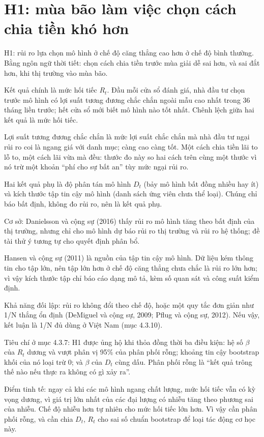 \section{H1: mùa bão làm việc chọn cách chia tiền khó hơn}

H1: rủi ro lựa chọn mô hình ở chế độ căng thẳng cao hơn ở chế độ bình thường. Bằng ngôn ngữ thời tiết: chọn cách chia tiền trước mùa giải dễ sai hơn, và sai đắt hơn, khi thị trường vào mùa bão.

Kết quả chính là mức hối tiếc \(R_{t}\). Đầu mỗi cửa sổ đánh giá, nhà đầu tư chọn trước mô hình có lợi suất tương đương chắc chắn ngoài mẫu cao nhất trong 36 tháng liền trước; hết cửa sổ mới biết mô hình nào tốt nhất. Chênh lệch giữa hai kết quả là mức hối tiếc.

Lợi suất tương đương chắc chắn là mức lợi suất chắc chắn mà nhà đầu tư ngại rủi ro coi là ngang giá với danh mục; càng cao càng tốt. Một cách chia tiền lãi to lỗ to, một cách lãi vừa mà đều: thước đo này so hai cách trên cùng một thước vì nó trừ một khoản “phí cho sự bất an” tùy mức ngại rủi ro.

Hai kết quả phụ là độ phân tán mô hình \(D_{t}\) (bảy mô hình bất đồng nhiều hay ít) và kích thước tập tin cậy mô hình (danh sách ứng viên chưa thể loại). Chúng chỉ báo bất định, không đo rủi ro, nên là kết quả phụ.

Cơ sở: Danielsson và cộng sự (2016) thấy rủi ro mô hình tăng theo bất định của thị trường, nhưng chỉ cho mô hình dự báo rủi ro thị trường và rủi ro hệ thống; đề tài thử ý tương tự cho quyết định phân bổ.

Hansen và cộng sự (2011) là nguồn của tập tin cậy mô hình. Dữ liệu kém thông tin cho tập lớn, nên tập lớn hơn ở chế độ căng thẳng chưa chắc là rủi ro lớn hơn; vì vậy kích thước tập chỉ báo cáo dạng mô tả, kèm số quan sát và công suất kiểm định.

Khả năng đối lập: rủi ro không đổi theo chế độ, hoặc một quy tắc đơn giản như 1/N thắng ổn định (DeMiguel và cộng sự, 2009; Pflug và cộng sự, 2012). Nếu vậy, kết luận là 1/N đủ dùng ở Việt Nam (mục 4.3.10).

Tiêu chí ở mục 4.3.7: H1 được ủng hộ khi thỏa đồng thời ba điều kiện: hệ số \(\beta\) của \(R_{t}\) dương và vượt phân vị 95\% của phân phối rỗng; khoảng tin cậy bootstrap khối của nó loại trừ 0; và \(\beta\) của \(D_{t}\) cùng dấu. Phân phối rỗng là “kết quả trông thế nào nếu thực ra không có gì xảy ra”.

Điểm tinh tế: ngay cả khi các mô hình ngang chất lượng, mức hối tiếc vẫn có kỳ vọng dương, vì giá trị lớn nhất của các đại lượng có nhiễu tăng theo phương sai của nhiễu. Chế độ nhiễu hơn tự nhiên cho mức hối tiếc lớn hơn. Vì vậy cần phân phối rỗng, và cần chia \(D_{t}\), \(R_{t}\) cho sai số chuẩn bootstrap để loại tác động cơ học này.

